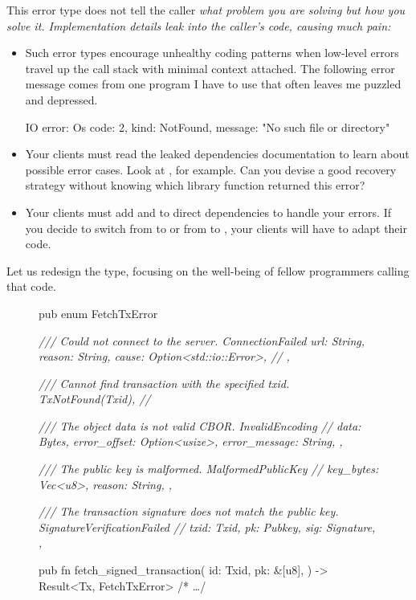 \documentclass{article}
\begin{document}
This error type does not tell the caller \em{what} problem you are solving but \em{how} you solve it.
Implementation details leak into the caller's code, causing much pain:
\begin{itemize}
 \item
   Such error types encourage unhealthy coding patterns when low-level errors travel up the call stack with minimal context attached.
   The following error message comes from one program I have to use that often leaves me puzzled and depressed.
   \begin{code}[bad]IO error: Os { code: 2, kind: NotFound, message: "No such file or directory" }\end{code}
 \item
   Your clients must read the leaked dependencies documentation to learn about possible error cases.
   Look at \href{https://docs.rs/openssl/0.10.42/openssl/ssl/struct.Error.html}{}, for example.
   Can you devise a good recovery strategy without knowing which  library function returned this error?
 \item
   Your clients must add  and  to direct dependencies to handle your errors.
   If you decide to switch from  to  or from  to , your clients will have to adapt their code.
\end{itemize}

Let us redesign the  type, focusing on the well-being of fellow programmers calling that code.

\begin{figure}
\begin{code}[good]
pub enum FetchTxError {
  \em{/// Could not connect to the server.}
  ConnectionFailed {
    url: String,
    reason: String,
    cause: Option<std::io::Error>, // 
  },

  \em{/// Cannot find transaction with the specified txid.}
  TxNotFound(Txid), // 

  \em{/// The object data is not valid CBOR.}
  InvalidEncoding { // 
    data: Bytes,
    error_offset: Option<usize>,
    error_message: String,
  },

  \em{/// The public key is malformed.}
  MalformedPublicKey { // 
    key_bytes: Vec<u8>,
    reason: String,
  },

  \em{/// The transaction signature does not match the public key.}
  SignatureVerificationFailed { // 
    txid: Txid,
    pk: Pubkey,
    sig: Signature,
  },
}

pub fn fetch_signed_transaction(
  id: Txid,
  pk: &[u8],
) -> Result<Tx, FetchTxError> { /* \ldots  */ }
\end{code}
\end{figure}
\end{document}
